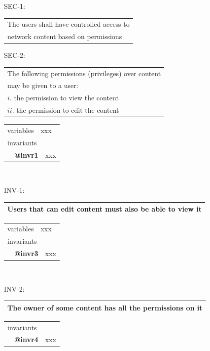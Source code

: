 \documentclass{article} %
\newcommand{\ebkeyw}[1]{\textcolor{pred}{\textsf{#1}}}
\newcommand{\ebtag}[1]{\textcolor{pgrey}{\textsf{\bf #1}}}
\begin{document}
\begin{center}
{\color{red!100}SEC-1}:
\begin{tabular}{|l|} \hline
The users shall have controlled access to \\
network content based on permissions\\
\hline
\end{tabular}
\end{center}
% 
 \begin{center}
 {\color{red!100}SEC-2}:
 \begin{tabular}{|l|} \hline
The following permissions (privileges) over content\\
may be given to a user: \\
 $i.$ the permission to view the content \\
 $ii.$ the permission to edit the content \\
 \hline
 \end{tabular}
 \end{center}
%
\begin{center}
\begin{tabular}{l}
\ebkeyw{variables}~~xxx\\
%
\ebkeyw{invariants}\\
~~\ebtag{@invr1}~~xxx\\
\end{tabular}
 \end{center}

 ~\\
 \bigskip

\begin{center}
{\color{red!100}INV-1}:
\begin{tabular}{|l|} \hline
Users that can edit content must also be able to view it\\ \hline
\end{tabular}
\end{center}
% 
\begin{center}
\begin{tabular}{l}
\ebkeyw{variables}~~xxx\\
%
\ebkeyw{invariants}\\
~~\ebtag{@invr3}~~xxx
\end{tabular}
\end{center}



 ~\\
 \bigskip

\begin{center}
{\color{red!100}INV-2}:
\begin{tabular}{|l|} \hline
The owner of some content has all the permissions on it \\ \hline
\end{tabular}
\end{center}
\begin{center}
\begin{tabular}{l}
%
\ebkeyw{invariants}\\
~~\ebtag{@invr4}~~xxx
\end{tabular}
\end{center}
\end{document}

